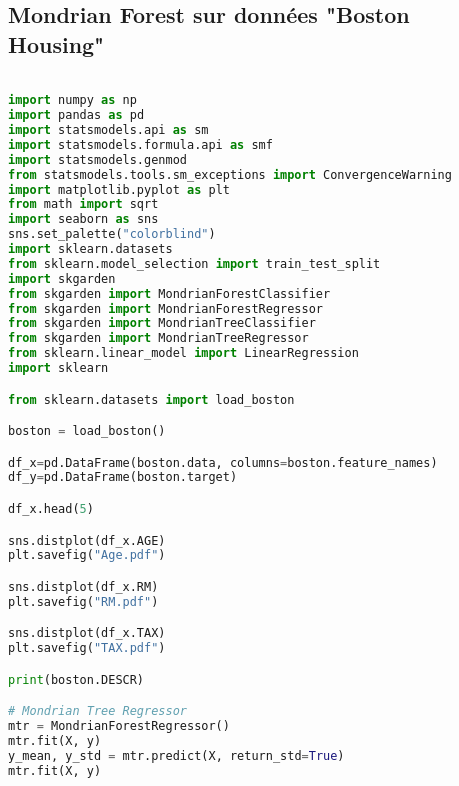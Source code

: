 \subsection*{Mondrian Forest sur données "Boston Housing"}
\begin{lstlisting}[language=Python]
%matplotlib inline

import numpy as np
import pandas as pd
import statsmodels.api as sm
import statsmodels.formula.api as smf
import statsmodels.genmod
from statsmodels.tools.sm_exceptions import ConvergenceWarning
import matplotlib.pyplot as plt
from math import sqrt
import seaborn as sns
sns.set_palette("colorblind")
import sklearn.datasets 
from sklearn.model_selection import train_test_split
import skgarden
from skgarden import MondrianForestClassifier
from skgarden import MondrianForestRegressor
from skgarden import MondrianTreeClassifier
from skgarden import MondrianTreeRegressor
from sklearn.linear_model import LinearRegression
import sklearn

from sklearn.datasets import load_boston

boston = load_boston()

df_x=pd.DataFrame(boston.data, columns=boston.feature_names)
df_y=pd.DataFrame(boston.target)

df_x.head(5)

sns.distplot(df_x.AGE)
plt.savefig("Age.pdf") 

sns.distplot(df_x.RM)
plt.savefig("RM.pdf") 

sns.distplot(df_x.TAX)
plt.savefig("TAX.pdf") 

print(boston.DESCR)

# Mondrian Tree Regressor
mtr = MondrianForestRegressor()
mtr.fit(X, y)
y_mean, y_std = mtr.predict(X, return_std=True)
mtr.fit(X, y)
\end{lstlisting}
